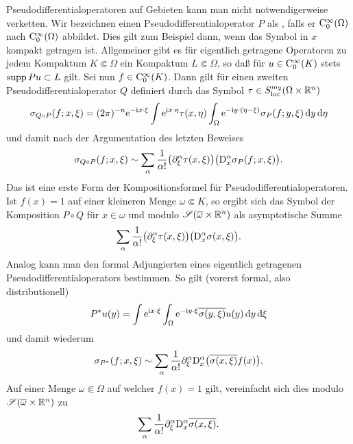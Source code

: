 Pseudodifferentialoperatoren auf Gebieten kann man nicht notwendigerweise verketten. Wir bezeichnen einen Pseudodifferentialoperator $P$ als , falls er $\mathrm C_0^\infty(\Omega)$ nach $\mathrm C_0^\infty(\Omega)$ abbildet. Dies gilt zum Beispiel dann, wenn das Symbol in $x$ kompakt getragen ist. Allgemeiner gibt es für eigentlich getragene Operatoren zu jedem Kompaktum $K\Subset\Omega$ ein Kompaktum $L\Subset\Omega$, so daß für $u\in\mathrm C_0^\infty(K)$ stets $\operatorname{supp} Pu \subset L$ gilt. Sei nun $f\in\mathrm C_0^\infty(K)$. Dann gilt für einen zweiten Pseudodifferentialoperator $Q$ definiert durch das Symbol $\tau\in S^{m_2}_{\rm loc}(\Omega\times\mathbb R^n)$
\begin{equation}
    \sigma_{Q\circ P} (f;x,\xi) = (2\pi)^{-n} \mathrm e^{-\mathrm i x\cdot\xi} \int \mathrm e^{\mathrm i x\cdot\eta}  \tau(x,\eta) 
      \int_{\Omega} \mathrm e^{-\mathrm i y\cdot(\eta-\xi)} \sigma_P(f;y,\xi) \,\mathrm d y \,\mathrm d\eta 
\end{equation}
und damit nach der Argumentation des letzten Beweises
\begin{equation}
    \sigma_{Q\circ P}(f;x,\xi) \sim \sum_\alpha \frac1{\alpha!} \big(\partial_\xi^\alpha \tau(x,\xi)\big) \big( \mathrm D_x^\alpha \sigma_P(f;x,\xi)\big).
\end{equation}
Das ist eine erste Form der Kompositionsformel für Pseudodifferentialoperatoren. Ist $f(x)=1$ auf einer kleineren Menge $\omega\Subset K$, so ergibt sich das Symbol der Komposition $P\circ Q$ für $x\in\omega$ und modulo $\mathscr S(\overline\omega\times\mathbb R^n)$ als asymptotische Summe
\begin{equation}
    \sum_{\alpha}  \frac1{\alpha!} \big(\partial_\xi^\alpha \tau(x,\xi)\big) \big( \mathrm D_x^\alpha \sigma(x,\xi)\big).
\end{equation}
Analog kann man den formal Adjungierten eines eigentlich getragenen Pseudodifferentialoperators bestimmen. So gilt (vorerst formal, also distributionell)
\begin{equation}
   P^* u (y) =\int \mathrm e^{\mathrm i x\cdot\xi}  \int_\Omega \mathrm e^{-\mathrm i y\cdot\xi} \overline{\sigma(y,\xi)} u(y)\,\mathrm d y\,\mathrm d\xi
\end{equation}
und damit wiederum
\begin{equation}
   \sigma_{P^*}(f;x,\xi) \sim \sum_\alpha \frac1{\alpha!} \partial_\xi^\alpha\mathrm D_x^\alpha \big(\overline{\sigma(x,\xi)} f(x)\big).
\end{equation}
Auf einer Menge $\omega\Subset\Omega$ auf welcher $f(x)=1$ gilt, vereinfacht sich dies modulo $\mathscr S(\overline\omega\times\mathbb R^n)$  zu
\begin{equation}
   \sum_\alpha \frac1{\alpha!} \partial_\xi^\alpha\mathrm D_x^\alpha \overline{\sigma(x,\xi)}.
\end{equation}
